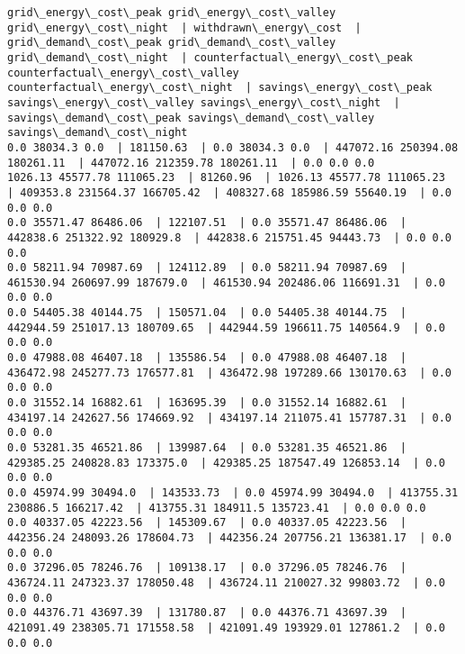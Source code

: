 \documentclass[11pt]{article}
\begin{document}
    \begin{Verbatim}[commandchars=\\\{\}]
grid\_energy\_cost\_peak grid\_energy\_cost\_valley grid\_energy\_cost\_night  | withdrawn\_energy\_cost  | grid\_demand\_cost\_peak grid\_demand\_cost\_valley grid\_demand\_cost\_night  | counterfactual\_energy\_cost\_peak counterfactual\_energy\_cost\_valley counterfactual\_energy\_cost\_night  | savings\_energy\_cost\_peak savings\_energy\_cost\_valley savings\_energy\_cost\_night  | savings\_demand\_cost\_peak savings\_demand\_cost\_valley savings\_demand\_cost\_night 
0.0 38034.3 0.0  | 181150.63  | 0.0 38034.3 0.0  | 447072.16 250394.08 180261.11  | 447072.16 212359.78 180261.11  | 0.0 0.0 0.0 
1026.13 45577.78 111065.23  | 81260.96  | 1026.13 45577.78 111065.23  | 409353.8 231564.37 166705.42  | 408327.68 185986.59 55640.19  | 0.0 0.0 0.0 
0.0 35571.47 86486.06  | 122107.51  | 0.0 35571.47 86486.06  | 442838.6 251322.92 180929.8  | 442838.6 215751.45 94443.73  | 0.0 0.0 0.0 
0.0 58211.94 70987.69  | 124112.89  | 0.0 58211.94 70987.69  | 461530.94 260697.99 187679.0  | 461530.94 202486.06 116691.31  | 0.0 0.0 0.0 
0.0 54405.38 40144.75  | 150571.04  | 0.0 54405.38 40144.75  | 442944.59 251017.13 180709.65  | 442944.59 196611.75 140564.9  | 0.0 0.0 0.0 
0.0 47988.08 46407.18  | 135586.54  | 0.0 47988.08 46407.18  | 436472.98 245277.73 176577.81  | 436472.98 197289.66 130170.63  | 0.0 0.0 0.0 
0.0 31552.14 16882.61  | 163695.39  | 0.0 31552.14 16882.61  | 434197.14 242627.56 174669.92  | 434197.14 211075.41 157787.31  | 0.0 0.0 0.0 
0.0 53281.35 46521.86  | 139987.64  | 0.0 53281.35 46521.86  | 429385.25 240828.83 173375.0  | 429385.25 187547.49 126853.14  | 0.0 0.0 0.0 
0.0 45974.99 30494.0  | 143533.73  | 0.0 45974.99 30494.0  | 413755.31 230886.5 166217.42  | 413755.31 184911.5 135723.41  | 0.0 0.0 0.0 
0.0 40337.05 42223.56  | 145309.67  | 0.0 40337.05 42223.56  | 442356.24 248093.26 178604.73  | 442356.24 207756.21 136381.17  | 0.0 0.0 0.0 
0.0 37296.05 78246.76  | 109138.17  | 0.0 37296.05 78246.76  | 436724.11 247323.37 178050.48  | 436724.11 210027.32 99803.72  | 0.0 0.0 0.0 
0.0 44376.71 43697.39  | 131780.87  | 0.0 44376.71 43697.39  | 421091.49 238305.71 171558.58  | 421091.49 193929.01 127861.2  | 0.0 0.0 0.0 

    \end{Verbatim}


    
    
    
    
\end{document}
